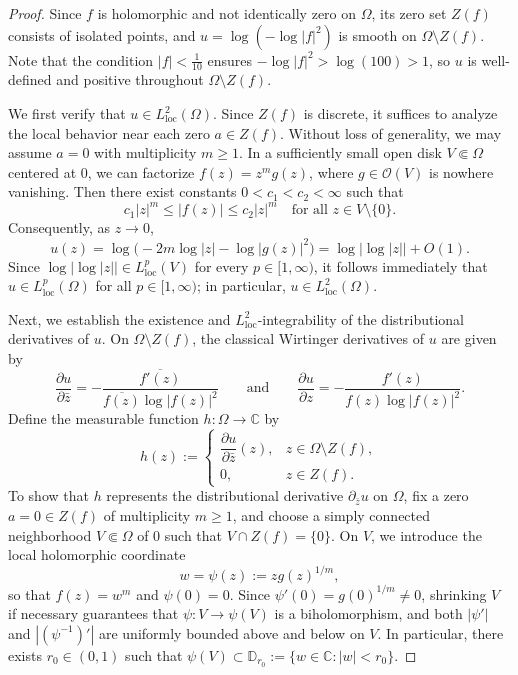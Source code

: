 \documentclass[12pt,twoside]{amsart}
\numberwithin{equation}{section}
\numberwithin{definition}{section} %
\begin{document}
\begin{proof}
Since $f$ is holomorphic and not identically zero on $\Omega$, its zero set $Z(f)$ consists of isolated points, and $u = \log(-\log |f|^2)$ is smooth on $\Omega \setminus Z(f)$. Note that the condition $|f| < \frac{1}{10}$ ensures $-\log|f|^2 > \log(100) > 1$, so $u$ is well-defined and positive throughout $\Omega \setminus Z(f)$.

We first verify that $u \in L^2_{\mathrm{loc}}(\Omega)$. Since $Z(f)$ is discrete, it suffices to analyze the local behavior near each zero $a \in Z(f)$. Without loss of generality, we may assume $a = 0$ with multiplicity $m \ge 1$. In a sufficiently small open disk $V \Subset \Omega$ centered at $0$, we can factorize $f(z) = z^m g(z)$, where $g \in \mathcal{O}(V)$ is nowhere vanishing. Then there exist constants $0 < c_1 < c_2 < \infty$ such that
\[
c_1 |z|^m \le |f(z)| \le c_2 |z|^m \quad \text{for all } z \in V \setminus \{0\}.
\]
Consequently, as $z \to 0$,
\[
u(z) = \log\bigl(-2m\log|z| - \log|g(z)|^2\bigr) = \log|\log|z|| + O(1).
\]
Since $\log|\log|z|| \in L^p_{\mathrm{loc}}(V)$ for every $p \in [1, \infty)$, it follows immediately that $u \in L^p_{\mathrm{loc}}(\Omega)$ for all $p \in [1, \infty)$; in particular, $u \in L^2_{\mathrm{loc}}(\Omega)$.

Next, we establish the existence and $L^2_{\mathrm{loc}}$-integrability of the distributional derivatives of $u$. On $\Omega \setminus Z(f)$, the classical Wirtinger derivatives of $u$ are given by
\begin{equation}\label{eq:u-first-derivatives}
\frac{\partial u}{\partial \bar{z}} = -\frac{\overline{f'(z)}}{\overline{f(z)} \log|f(z)|^2} \qquad \text{and} \qquad \frac{\partial u}{\partial z} = -\frac{f'(z)}{f(z) \log|f(z)|^2}.
\end{equation}
Define the measurable function $h \colon \Omega \to \mathbb{C}$ by
\[
h(z) := 
\begin{cases}
\dfrac{\partial u}{\partial \bar{z}}(z), & z \in \Omega \setminus Z(f), \\[6pt]
0, & z \in Z(f).
\end{cases}
\]
To show that $h$ represents the distributional derivative $\partial_{\bar{z}} u$ on $\Omega$, fix a zero $a = 0 \in Z(f)$ of multiplicity $m \ge 1$, and choose a simply connected neighborhood $V \Subset \Omega$ of $0$ such that $V \cap Z(f) = \{0\}$. On $V$, we introduce the local holomorphic coordinate 
\[
w = \psi(z) := z g(z)^{1/m},
\]
so that $f(z) = w^m$ and $\psi(0) = 0$. Since $\psi'(0) = g(0)^{1/m} \neq 0$, shrinking $V$ if necessary guarantees that $\psi \colon V \to \psi(V)$ is a biholomorphism, and both $|\psi'|$ and $|(\psi^{-1})'|$ are uniformly bounded above and below on $V$. In particular, there exists $r_0 \in (0, 1)$ such that $\psi(V) \subset \mathbb{D}_{r_0} := \{w \in \mathbb{C} : |w| < r_0\}$. 


\end{proof}
\end{document}
